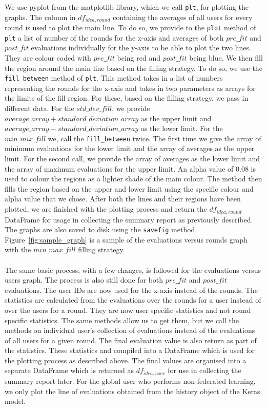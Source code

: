 \documentclass[12pt]{article}
\begin{document}
We use pyplot from the matplotlib library, which we call \texttt{plt}, for plotting the graphs. The column in $df_{idea, round}$ containing the averages of all users for every round is used to plot the main line. To do so, we provide to the \texttt{plot} method of \texttt{plt} a list of number of the rounds for the x-axis and averages of both $pre\_fit$ and $post\_fit$ evaluations individually for the y-axis to be able to plot the two lines. They are colour coded with $pre\_fit$ being red and $post\_fit$ being blue. We then fill the region around the main line based on the filling strategy. To do so, we use the \texttt{fill\_between} method of \texttt{plt}. This method takes in a list of numbers representing the rounds for the x-axis and takes in two parameters as arrays for the limits of the fill region. For these, based on the filling strategy, we pass in different data. For the $std\_dev\_fill$, we provide $average\_array + standard\_deviation\_array$ as the upper limit and $average\_array - standard\_deviation\_array$ as the lower limit. For the $min\_mix\_fill$ we, call the \texttt{fill\_between} twice. The first time we give the array of minimum evaluations for the lower limit and the array of averages as the upper limit. For the second call, we provide the array of averages as the lower limit and the array of maximum evaluations for the upper limit. An alpha value of $0.08$ is used to colour the regions as a lighter shade of the main colour. The method then fills the region based on the upper and lower limit using the specific colour and alpha value that we chose. After both the lines and their regions have been plotted, we are finished with the plotting process and return the $df_{idea, round}$ DataFrame for usage in collecting the summary report as previously described. The graphs are also saved to disk using the \texttt{savefig} method. Figure~\ref{fig:sample_graph} is a sample of the evaluations versus rounds graph with the $min\_max\_fill$ filling strategy. 
\\\\
The same basic process, with a few changes, is followed for the evaluations versus users graph. The process is also still done for both $pre\_fit$ and $post\_fit$ evaluations. The user IDs are now used for the x-axis instead of the rounds. The statistics are calculated from the evaluations over the rounds for a user instead of over the users for a round. They are now user specific statistics and not round specific statistics. The same methods allow us to get them, but we call the methods on individual user's collection of evaluations instead of the evaluations of all users for a given round. The final evaluation value is also return as part of the statistics. These statistics and compiled into a DataFrame which is used for the plotting process as described above. The final values are organised into a separate DataFrame which is returned as $df_{idea, user}$ for use in collecting the summary report later. For the global user who performs non-federated learning, we only plot the line of evaluations obtained from the history object of the Keras model. 
\end{document}
